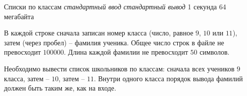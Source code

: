 \begin{problem}%
{Списки по классам}%
{\textsl{стандартный ввод}}%
{\textsl{стандартный вывод}}%
{1 секунда}%
{64 мегабайта}{}

\InputFile

В каждой строке сначала записан номер класса (число, равное $9$, $10$ или $11$), затем (через пробел) – фамилия ученика. Общее число строк в файле не превосходит $100000$. Длина каждой фамилии не превосходит $50$ символов.

\OutputFile

Необходимо вывести список школьников по классам: сначала всех учеников $9$ класса, затем – $10$, затем – $11$. Внутри одного класса порядок вывода фамилий должен быть таким же, как на входе.

\Examples

\begin{example}
%
\end{example}
\end{problem}
